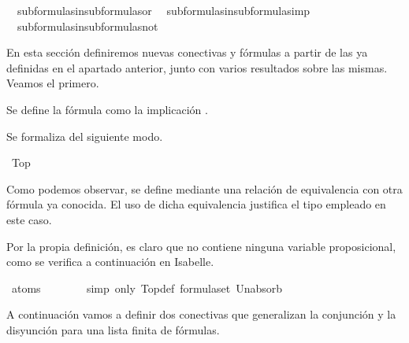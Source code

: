 \begin{isabellebody}
\ \ subformulas{\isacharunderscore}in{\isacharunderscore}subformulas{\isacharunderscore}or\isanewline
\ \ subformulas{\isacharunderscore}in{\isacharunderscore}subformulas{\isacharunderscore}imp\isanewline
\ \ subformulas{\isacharunderscore}in{\isacharunderscore}subformulas{\isacharunderscore}not%
\isadelimdocument
%
\endisadelimdocument
%
\isatagdocument
%
\isamarkuptrue%
%
\endisatagdocument
{\isafolddocument}%
%
\isadelimdocument
%
\endisadelimdocument
%
\begin{isamarkuptext}%
En esta sección definiremos nuevas conectivas y fórmulas a partir 
  de las ya definidas en el apartado anterior, junto con varios 
  resultados sobre las mismas. Veamos el primero.

  \begin{definicion}
    Se define la fórmula \isa{{\isasymtop}} como la implicación \isa{{\isasymbottom}\ {\isasymlongrightarrow}\ {\isasymbottom}}.
  \end{definicion}

  Se formaliza del siguiente modo.%
\end{isamarkuptext}\isamarkuptrue%
\isamarkupfalse%
\ Top\ {\isacharparenleft}{\isachardoublequoteopen}{\isasymtop}{\isachardoublequoteclose}{\isacharparenright}\ \isanewline
\ \ {\isachardoublequoteopen}{\isasymtop}\ {\isasymequiv}\ {\isasymbottom}\ \isactrlbold {\isasymrightarrow}\ {\isasymbottom}{\isachardoublequoteclose}%
\begin{isamarkuptext}%
Como podemos observar, se define mediante una relación de 
  equivalencia con otra fórmula ya conocida. El uso de dicha 
  equivalencia justifica el tipo  empleado en este 
  caso. 

  Por la propia definición, es claro que \isa{{\isasymtop}} no contiene ninguna
  variable proposicional, como se verifica a continuación en Isabelle.%
\end{isamarkuptext}\isamarkuptrue%
\isamarkupfalse%
\ {\isachardoublequoteopen}atoms\ {\isasymtop}\ {\isacharequal}\ {\isasymemptyset}{\isachardoublequoteclose}\isanewline
%
\isadelimproof
\ \ \ %
\endisadelimproof
%
\isatagproof
{}\isamarkupfalse%
\ {\isacharparenleft}simp\ only{\isacharcolon}\ Top{\isacharunderscore}def\ formula{\isachardot}set\ Un{\isacharunderscore}absorb{\isacharparenright}%
\endisatagproof
{\isafoldproof}%
%
\isadelimproof
%
\endisadelimproof
%
\begin{isamarkuptext}%
A continuación vamos a definir dos conectivas que generalizan la 
  conjunción y la disyunción para una lista finita de fórmulas. 


\end{isamarkuptext}
\end{isabellebody}
